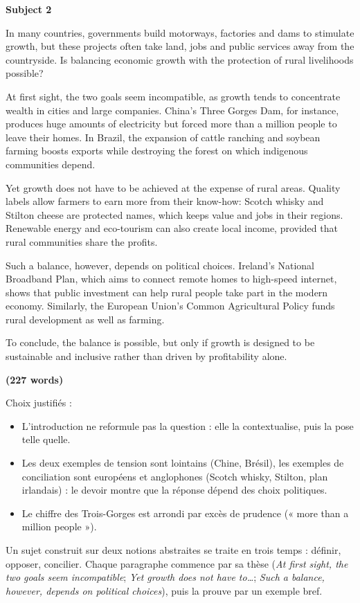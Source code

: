 \documentclass[11pt,a4paper]{article}
\providecommand{\tightlist}{\setlength{\itemsep}{0pt}\setlength{\parskip}{0pt}}
\begin{document}
\textbf{Subject 2}

In many countries, governments build motorways, factories and dams to stimulate growth, but these projects often take land, jobs and public services away from the countryside. Is balancing economic growth with the protection of rural livelihoods possible?

At first sight, the two goals seem incompatible, as growth tends to concentrate wealth in cities and large companies. China's Three Gorges Dam, for instance, produces huge amounts of electricity but forced more than a million people to leave their homes. In Brazil, the expansion of cattle ranching and soybean farming boosts exports while destroying the forest on which indigenous communities depend.

Yet growth does not have to be achieved at the expense of rural areas. Quality labels allow farmers to earn more from their know-how: Scotch whisky and Stilton cheese are protected names, which keeps value and jobs in their regions. Renewable energy and eco-tourism can also create local income, provided that rural communities share the profits.

Such a balance, however, depends on political choices. Ireland's National Broadband Plan, which aims to connect remote homes to high-speed internet, shows that public investment can help rural people take part in the modern economy. Similarly, the European Union's Common Agricultural Policy funds rural development as well as farming.

To conclude, the balance is possible, but only if growth is designed to be sustainable and inclusive rather than driven by profitability alone.

\textbf{(227 words)}

Choix justifiés :

\begin{itemize}
\tightlist
\item
  L'introduction ne reformule pas la question : elle la contextualise, puis la pose telle quelle.
\item
  Les deux exemples de tension sont lointains (Chine, Brésil), les exemples de conciliation sont européens et anglophones (Scotch whisky, Stilton, plan irlandais) : le devoir montre que la réponse dépend des choix politiques.
\item
  Le chiffre des Trois-Gorges est arrondi par excès de prudence (« more than a million people »).
\end{itemize}

\begin{methode}

Un sujet construit sur deux notions abstraites se traite en trois temps : définir, opposer, concilier. Chaque paragraphe commence par sa thèse (\emph{At first sight, the two goals seem incompatible}; \emph{Yet growth does not have to\ldots{}}; \emph{Such a balance, however, depends on political choices}), puis la prouve par un exemple bref.

\end{methode}
\end{document}
